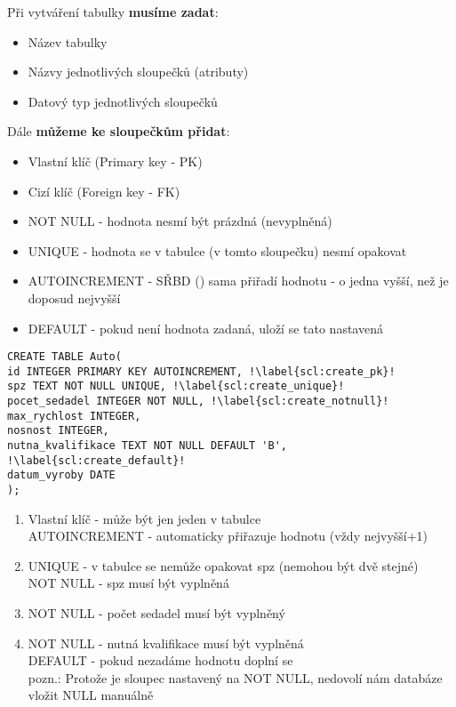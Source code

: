 \vspace{1cm}
Při vytváření tabulky \textbf{musíme zadat}:
\begin{itemize}
\item Název tabulky
\item Názvy jednotlivých sloupečků (atributy)
\item Datový typ jednotlivých sloupečků
\end{itemize}
Dále \textbf{můžeme ke sloupečkům přidat}:
\begin{itemize}
\item Vlastní klíč (Primary key - PK)
\item Cizí klíč (Foreign key - FK)
\item NOT NULL - hodnota nesmí být prázdná (nevyplněná)
\item UNIQUE - hodnota se v tabulce (v tomto sloupečku) nesmí opakovat
\item AUTOINCREMENT - SŘBD () sama přiřadí hodnotu - o jedna vyšší, než je doposud nejvyšší
\item DEFAULT - pokud není hodnota zadaná, uloží se tato nastavená 
\end{itemize}

\begin{minipage}[t]{.45\textwidth}
\begin{code}
\begin{verbatim}
CREATE TABLE Auto( 
id INTEGER PRIMARY KEY AUTOINCREMENT, !\label{scl:create_pk}!
spz TEXT NOT NULL UNIQUE, !\label{scl:create_unique}!
pocet_sedadel INTEGER NOT NULL, !\label{scl:create_notnull}!
max_rychlost INTEGER,
nosnost INTEGER,
nutna_kvalifikace TEXT NOT NULL DEFAULT 'B', !\label{scl:create_default}!
datum_vyroby DATE
);
\end{verbatim}
\label{code:create_table_set_properties}
\end{code}
\end{minipage}
\begin{minipage}[t]{.45\textwidth}
\begin{enumerate}
\item[ř. \ref{scl:create_pk}:]	Vlastní klíč - může být jen jeden v tabulce\\AUTOINCREMENT - automaticky přiřazuje hodnotu (vždy nejvyšší+1)
\item[ř. \ref{scl:create_unique}:] UNIQUE - v tabulce se nemůže opakovat spz (nemohou být dvě stejné)\\NOT NULL - spz musí být vyplněná
\item[ř. \ref{scl:create_notnull}:] NOT NULL - počet sedadel musí být vyplněný 
\item[ř. \ref{scl:create_default}:] NOT NULL - nutná kvalifikace musí být vyplněná\\DEFAULT - pokud nezadáme hodnotu doplní se \\pozn.: Protože je sloupec nastavený na NOT NULL, nedovolí nám databáze vložit NULL manuálně 
\end{enumerate} 
\end{minipage}

